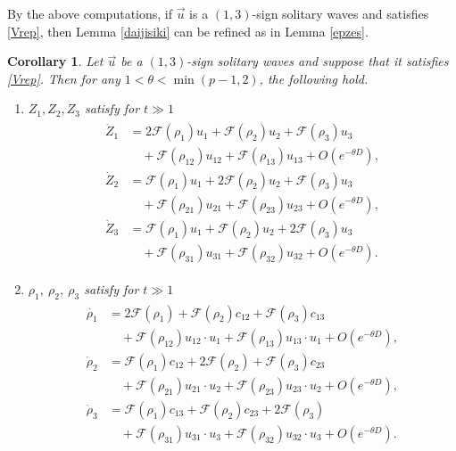 \documentclass[reqno]{amsart}
\theoremstyle{plain}
\newtheorem{corollary}[theorem]{Corollary}
\theoremstyle{definition}
\numberwithin{equation}{section}
\newcommand{\1}{\mathbbm{1}}
\begin{document}
By the above computations, if $\vec{u}$ is a $(1,3)$-sign solitary waves and satisfies \eqref{Vrep}, then Lemma \ref{daijisiki} can be refined as in Lemma \ref{epzes}.
\begin{corollary}\label{corollary}
Let $\vec{u}$ be a $(1,3)$-sign solitary waves and suppose that it satisfies \eqref{Vrep}. Then for any $1<\theta<\min{(p-1,2)}$, the following hold.
\begin{enumerate}
\item $Z_1,Z_2,Z_3$ satisfy for $t\gg 1$
\begin{align}\label{Zes10210}
\begin{aligned}
\dot{Z}_1&=2\mathcal{F}(\rho_1)u_1+\mathcal{F}(\rho_2)u_2+\mathcal{F}(\rho_3)u_3
\\
&\quad +\mathcal{F}(\rho_{12})u_{12}+\mathcal{F}(\rho_{13})u_{13}+O\left(e^{-\theta D}\right),
\\
\dot{Z}_2&=\mathcal{F}(\rho_1)u_1+2\mathcal{F}(\rho_2)u_2+\mathcal{F}(\rho_3)u_3
\\
&\quad+\mathcal{F}(\rho_{21})u_{21}+\mathcal{F}(\rho_{23})u_{23}+O\left(e^{-\theta D}\right),
\\
\dot{Z}_3&=\mathcal{F}(\rho_1)u_1+\mathcal{F}(\rho_2)u_2+2\mathcal{F}(\rho_3)u_3
\\
&\quad +\mathcal{F}(\rho_{31})u_{31}+\mathcal{F}(\rho_{32})u_{32}+O\left(e^{-\theta D}\right).
\end{aligned}
\end{align}

\item $\rho_1,\ \rho_2,\ \rho_3$ satisfy for $t\gg 1$
\begin{align}\label{rhoes10210}
\begin{aligned}
\dot{\rho_1}&=2\mathcal{F}(\rho_1)+\mathcal{F}(\rho_2)c_{12}+\mathcal{F}(\rho_3)c_{13}
\\
&\quad+\mathcal{F}(\rho_{12})u_{12}\cdot u_1+\mathcal{F}(\rho_{13})u_{13}\cdot u_1+O\left(e^{-\theta D}\right),
\\
\dot{\rho}_2&=\mathcal{F}(\rho_1)c_{12}+2\mathcal{F}(\rho_2)+\mathcal{F}(\rho_3)c_{23}
\\
&\quad+\mathcal{F}(\rho_{21})u_{21}\cdot u_2+\mathcal{F}(\rho_{23})u_{23}\cdot u_2+O\left(e^{-\theta D}\right),
\\
\dot{\rho}_3&=\mathcal{F}(\rho_{1})c_{13}+\mathcal{F}(\rho_2)c_{23}+2\mathcal{F}(\rho_3)
\\
&\quad+\mathcal{F}(\rho_{31})u_{31}\cdot u_3+\mathcal{F}(\rho_{32})u_{32}\cdot u_3+O\left(e^{-\theta D}\right).
\end{aligned}
\end{align}


\end{enumerate}
\end{corollary}
\end{document}
